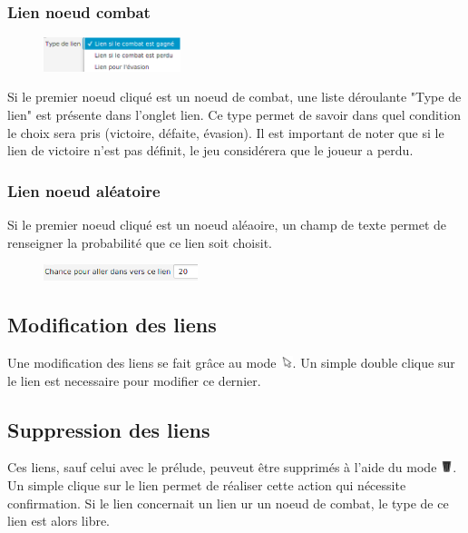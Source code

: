 			\subsubsection{Lien noeud combat}
				\label{subsubsec:lienCombat}

				\begin{figure}
					\centering\includegraphics[width=4cm, keepaspectratio]{img/lienCombat.png}
				\end{figure}
				Si le premier noeud cliqué est un noeud de combat, une liste déroulante "Type de lien" est présente dans l'onglet lien. Ce type permet de savoir dans quel condition le choix sera pris (victoire, défaite, évasion). Il est important de noter que si le lien de victoire n'est pas définit, le jeu considérera que le joueur a perdu.

			\subsubsection{Lien noeud aléatoire}
				\label{subsubsec:lienAléatoire}

				Si le premier noeud cliqué est un noeud aléaoire, un champ de texte permet de renseigner la probabilité que ce lien soit choisit.

				\begin{figure}[H]
					\centering\includegraphics[width=0.4\textwidth, keepaspectratio]{img/lienAleatoire.png}
				\end{figure}

		\subsection{Modification des liens}

			Une modification des liens se fait grâce au mode \includegraphics[height=10pt, keepaspectratio]{img/icons/select.png}. Un simple double clique sur le lien est necessaire pour modifier ce dernier.

		\subsection{Suppression des liens}

			Ces liens, sauf celui avec le prélude, peuveut être supprimés à l'aide du mode \includegraphics[height=10pt, keepaspectratio]{img/icons/delete.png}. Un simple clique sur le lien permet de réaliser cette action qui nécessite confirmation. Si le lien concernait un lien ur un noeud de combat, le type de ce lien est alors libre.
